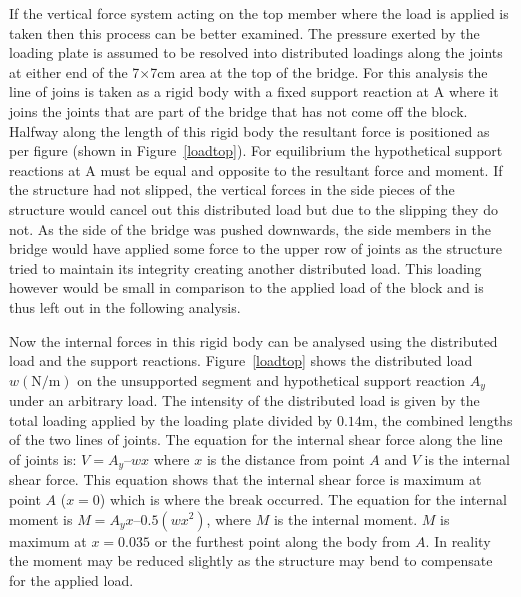 \documentclass[12pt]{article}
\begin{document}
If the vertical force system acting on the top member where the load is applied is taken then this process can be better examined. The pressure exerted by the loading plate is assumed to be resolved into distributed loadings along the joints at either end of the 7$\times$7cm area at the top of the bridge. For this analysis the line of joins is taken as a rigid body with a fixed support reaction at A where it joins the joints that are part of the bridge that has not come off the block. Halfway along the length of this rigid body the resultant force is positioned as per figure (shown in Figure~\ref{loadtop}).  For equilibrium the hypothetical support reactions at A must be equal and opposite to the resultant force and moment. If the structure had not slipped, the vertical forces in the side pieces of the structure would cancel out this distributed load but due to the slipping they do not. As the side of the bridge was pushed downwards, the side members in the bridge would have applied some force to the upper row of joints as the structure tried to maintain its integrity creating another distributed load. This loading however would be small in comparison to the applied load of the block and is thus left out in the following analysis.

Now the internal forces in this rigid body can be analysed using the distributed load and the support reactions.  Figure~\ref{loadtop} shows the distributed load $w \mathrm{(N/m)}$ on the unsupported segment and hypothetical support reaction $A_y$ under an arbitrary load. The intensity of the distributed load is given by the total loading applied by the loading plate divided by $0.14\mathrm{m}$, the combined lengths of the two lines of joints. The equation for the internal shear force along the line of joints is: $V=A_y–wx$ where $x$ is the distance from point $A$ and $V$ is the internal shear force. This equation shows that the internal shear force is maximum at point $A$ ($x=0$) which is where the break occurred. The equation for the internal moment is $M = A_yx –0.5(wx^2)$, where $M$ is the internal moment. $M$ is maximum at $x = 0.035$ or the furthest point along the body from $A$. In reality the moment may be reduced slightly as the structure may bend to compensate for the applied load.
\end{document}
